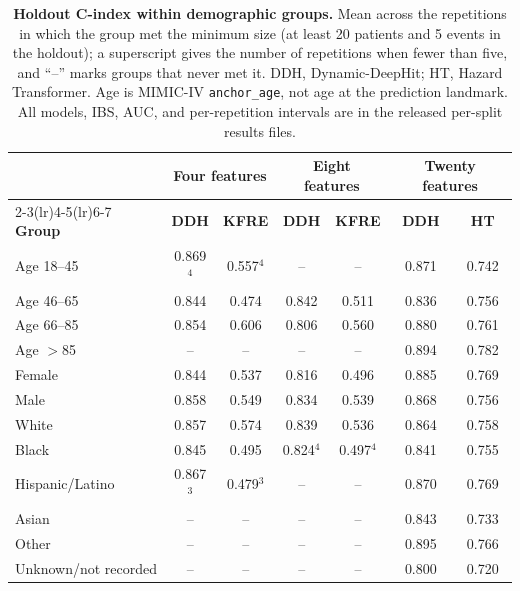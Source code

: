 \begin{table}[htbp]
\centering
\footnotesize
\setlength{\tabcolsep}{3pt}
\begin{tabular}{@{}lcccccc@{}}
\toprule
 & \multicolumn{2}{c}{\textbf{Four features}} & \multicolumn{2}{c}{\textbf{Eight features}} & \multicolumn{2}{c}{\textbf{Twenty features}} \\
\cmidrule(lr){2-3}\cmidrule(lr){4-5}\cmidrule(lr){6-7}
\textbf{Group} & \textbf{DDH} & \textbf{KFRE} & \textbf{DDH} & \textbf{KFRE} & \textbf{DDH} & \textbf{HT} \\
\midrule
Age 18--45 & 0.869$^{4}$ & 0.557$^{4}$ & -- & -- & 0.871 & 0.742 \\
Age 46--65 & 0.844 & 0.474 & 0.842 & 0.511 & 0.836 & 0.756 \\
Age 66--85 & 0.854 & 0.606 & 0.806 & 0.560 & 0.880 & 0.761 \\
Age $>$85 & -- & -- & -- & -- & 0.894 & 0.782 \\
Female & 0.844 & 0.537 & 0.816 & 0.496 & 0.885 & 0.769 \\
Male & 0.858 & 0.549 & 0.834 & 0.539 & 0.868 & 0.756 \\
White & 0.857 & 0.574 & 0.839 & 0.536 & 0.864 & 0.758 \\
Black & 0.845 & 0.495 & 0.824$^{4}$ & 0.497$^{4}$ & 0.841 & 0.755 \\
Hispanic/Latino & 0.867$^{3}$ & 0.479$^{3}$ & -- & -- & 0.870 & 0.769 \\
Asian & -- & -- & -- & -- & 0.843 & 0.733 \\
Other & -- & -- & -- & -- & 0.895 & 0.766 \\
Unknown/not recorded & -- & -- & -- & -- & 0.800 & 0.720 \\
\bottomrule
\end{tabular}
\caption{{\bf Holdout C-index within demographic groups.} Mean across the repetitions in which the group met the minimum size (at least 20 patients and 5 events in the holdout); a superscript gives the number of repetitions when fewer than five, and ``--'' marks groups that never met it. DDH, Dynamic-DeepHit; HT, Hazard Transformer. Age is MIMIC-IV \texttt{anchor\_age}, not age at the prediction landmark. All models, IBS, AUC, and per-repetition intervals are in the released per-split results files.}
\label{tab:subgroup}
\end{table}

